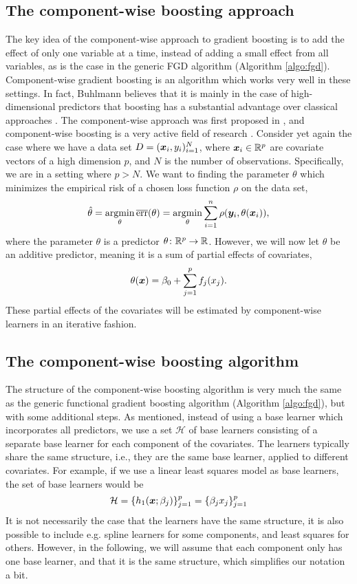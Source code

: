 \subsection{The component-wise boosting approach}
\label{subsec:comp-wise approach}
The key idea of the component-wise approach to gradient boosting is to add the effect of only one variable at a time, instead of adding a small effect from all variables, as is the case in the generic FGD algorithm (Algorithm \ref{algo:fgd}).
Component-wise gradient boosting is an algorithm which works very well in these settings.
In fact, Buhlmann believes that it is mainly in the case of high-dimensional predictors that boosting has a substantial advantage over classical approaches \citep{buhlmann2006}.
The component-wise approach was first proposed in \citep{buhlmann-yu}, and component-wise boosting is a very active field of research \citep{buhlmann2006, mayr14a, mayr14b, mayr17}.
Consider yet again the case where we have a data set $D=(\bm{x}_i,y_i)_{i=1}^N$, where $\bm{x}_i\in\mathbb{R}^p$ are covariate vectors of a high dimension $p$, and $N$ is the number of observations.
Specifically, we are in a setting where $p>N$.
We want to finding the parameter $\theta$ which minimizes the empirical risk of a chosen loss function $\rho$ on the data set,
\begin{equation*}
    \hat{\theta}=\operatorname*{argmin}_{\theta}\overline{\text{err}}(\theta)=\operatorname*{argmin}_{\theta}\sum_{i=1}^n\rho(\bm{y}_i,\theta(\bm{x}_i)),
\end{equation*}
where the parameter $\theta$ is a predictor $\theta\colon\mathbb{R}^p\to\mathbb{R}$.
However, we will now let $\theta$ be an additive predictor, meaning it is a sum of partial effects of covariates,
\begin{equation*}
    \theta(\bm{x})=\beta_0+\sum_{j=1}^p f_j(x_j).
\end{equation*}
These partial effects of the covariates will be estimated by component-wise learners in an iterative fashion.

\subsection{The component-wise boosting algorithm}
The structure of the component-wise boosting algorithm is very much the same as the generic functional gradient boosting algorithm (Algorithm \ref{algo:fgd}), but with some additional steps.
As mentioned, instead of using a base learner which incorporates all predictors, we use a set $\mathcal{H}$ of base learners consisting of a separate base learner for each component of the covariates.
The learners typically share the same structure, i.e., they are the same base learner, applied to different covariates.
For example, if we use a linear least squares model as base learners, the set of base learners would be
\begin{equation*}
    \mathcal{H}=\{h_1(\bm{x};\beta_j)\}_{j=1}^p=\{\beta_j x_j\}_{j=1}^p
\end{equation*}
It is not necessarily the case that the learners have the same structure, it is also possible to include e.g. spline learners for some components, and least squares for others.
However, in the following, we will assume that each component only has one base learner, and that it is the same structure, which simplifies our notation a bit.

